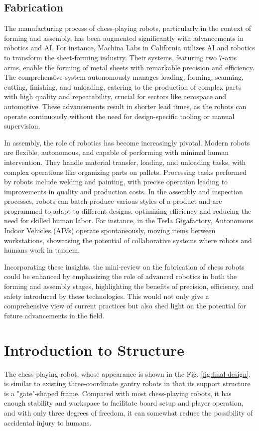 \documentclass[10pt, a4paper, twocolumn]{article}
\begin{document}
\subsection{Fabrication}
The manufacturing process of chess-playing robots, particularly in the context of forming and assembly, has been augmented significantly with advancements in robotics and AI. For instance, Machina Labs in California utilizes AI and robotics to transform the sheet-forming industry. Their systems, featuring two 7-axis arms, enable the forming of metal sheets with remarkable precision and efficiency\cite{Khalid2023}. The comprehensive system autonomously manages loading, forming, scanning, cutting, finishing, and unloading, catering to the production of complex parts with high quality and repeatability, crucial for sectors like aerospace and automotive. These advancements result in shorter lead times, as the robots can operate continuously without the need for design-specific tooling or manual supervision\cite{harfoush2021application}.

In assembly, the role of robotics has become increasingly pivotal. Modern robots are flexible, autonomous, and capable of performing with minimal human intervention. They handle material transfer, loading, and unloading tasks, with complex operations like organizing parts on pallets. Processing tasks performed by robots include welding and painting, with precise operation leading to improvements in quality and production costs. In the assembly and inspection processes, robots can batch-produce various styles of a product and are programmed to adapt to different designs, optimizing efficiency and reducing the need for skilled human labor. For instance, in the Tesla Gigafactory, Autonomous Indoor Vehicles (AIVs) operate spontaneously, moving items between workstations, showcasing the potential of collaborative systems where robots and humans work in tandem\cite{RobotsNet2019}.

Incorporating these insights, the mini-review on the fabrication of chess robots could be enhanced by emphasizing the role of advanced robotics in both the forming and assembly stages, highlighting the benefits of precision, efficiency, and safety introduced by these technologies. This would not only give a comprehensive view of current practices but also shed light on the potential for future advancements in the field.

\section{Introduction to Structure}
The chess-playing robot, whose appearance is shown in the Fig. \ref{fig:final design}, is similar to existing three-coordinate gantry robots in that its support structure is a "gate"-shaped frame. Compared with most chess-playing robots, it has enough stability and workspace to facilitate board setup and player operation, and with only three degrees of freedom, it can somewhat reduce the possibility of accidental injury to humans.
\end{document}

